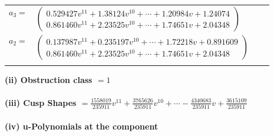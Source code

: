 \documentclass[1p]{elsarticle_modified}
\theoremstyle{definition}
\begin{document}
\begin{tabular}{m{7pt} m{180pt} m{7pt} m{180pt} }
\flushright $a_{3}=$&$\begin{pmatrix}0.529427 v^{11}+1.38124 v^{10}+\cdots+1.20984 v+1.24074\\0.861460 v^{11}+2.23525 v^{10}+\cdots+1.74651 v+2.04348\end{pmatrix}$ \\
\flushright $a_{2}=$&$\begin{pmatrix}0.137987 v^{11}+0.235197 v^{10}+\cdots+1.72218 v+0.891609\\0.861460 v^{11}+2.23525 v^{10}+\cdots+1.74651 v+2.04348\end{pmatrix}$\\&\end{tabular}
\flushleft \textbf{(ii) Obstruction class $= 1$}\\~\\
\flushleft \textbf{(iii) Cusp Shapes $= \frac{1558019}{235911} v^{11}+\frac{3765626}{235911} v^{10}+\cdots-\frac{4340683}{235911} v+\frac{3615109}{235911}$}\\~\\
\newpage\renewcommand{\arraystretch}{1}
\flushleft \textbf{(iv) u-Polynomials at the component}\newline \\
\end{document}
